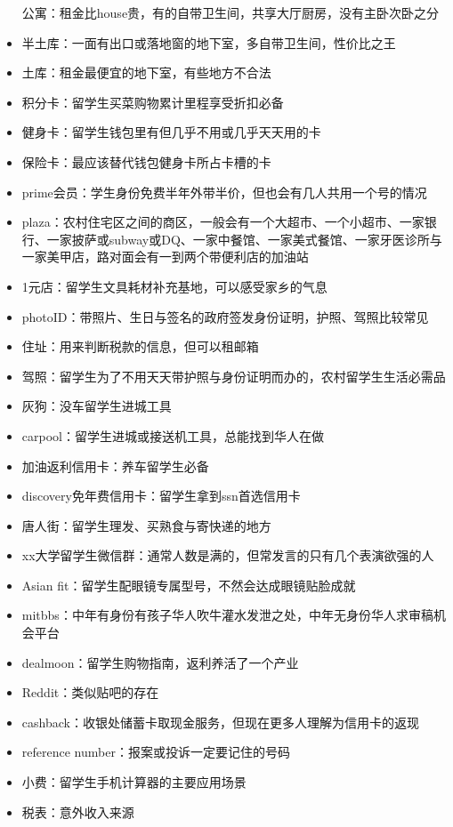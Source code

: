 \documentclass[]{tufte-book}
\begin{document}
\begin{itemize}
  公寓：租金比house贵，有的自带卫生间，共享大厅厨房，没有主卧次卧之分
\item
  半土库：一面有出口或落地窗的地下室，多自带卫生间，性价比之王
\item
  土库：租金最便宜的地下室，有些地方不合法
\item
  积分卡：留学生买菜购物累计里程享受折扣必备
\item
  健身卡：留学生钱包里有但几乎不用或几乎天天用的卡
\item
  保险卡：最应该替代钱包健身卡所占卡槽的卡
\item
  prime会员：学生身份免费半年外带半价，但也会有几人共用一个号的情况
\item
  plaza：农村住宅区之间的商区，一般会有一个大超市、一个小超市、一家银行、一家披萨或subway或DQ、一家中餐馆、一家美式餐馆、一家牙医诊所与一家美甲店，路对面会有一到两个带便利店的加油站
\item
  1元店：留学生文具耗材补充基地，可以感受家乡的气息
\item
  photoID：带照片、生日与签名的政府签发身份证明，护照、驾照比较常见
\item
  住址：用来判断税款的信息，但可以租邮箱
\item
  驾照：留学生为了不用天天带护照与身份证明而办的，农村留学生生活必需品
\item
  灰狗：没车留学生进城工具
\item
  carpool：留学生进城或接送机工具，总能找到华人在做
\item
  加油返利信用卡：养车留学生必备
\item
  discovery免年费信用卡：留学生拿到ssn首选信用卡
\item
  唐人街：留学生理发、买熟食与寄快递的地方
\item
  xx大学留学生微信群：通常人数是满的，但常发言的只有几个表演欲强的人
\item
  Asian fit：留学生配眼镜专属型号，不然会达成眼镜贴脸成就
\item
  mitbbs：中年有身份有孩子华人吹牛灌水发泄之处，中年无身份华人求审稿机会平台
\item
  dealmoon：留学生购物指南，返利养活了一个产业
\item
  Reddit：类似贴吧的存在
\item
  cashback：收银处储蓄卡取现金服务，但现在更多人理解为信用卡的返现
\item
  reference number：报案或投诉一定要记住的号码
\item
  小费：留学生手机计算器的主要应用场景
\item
  税表：意外收入来源

\end{itemize}
\end{document}

